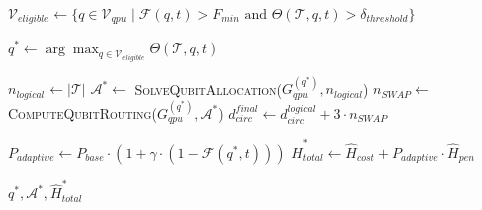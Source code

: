 \documentclass[lettersize,journal]{IEEEtran}
\begin{document}
\begin{algorithm}[t]
\scriptsize
\SetAlgoNoEnd
\caption{Fidelity-Aware Qubit Mapping and Task Scheduling}
\label{alg:fidelity_orchestration}
\BlankLine

\label{line:fo_retrieve_start}
\label{line:fo_retrieve_end}

\label{line:fo_filter}
$\mathcal{V}_{eligible} \leftarrow \{q \in \mathcal{V}_{qpu} \mid \mathcal{F}(q, t) > F_{min} \text{ and } \Theta(\mathcal{T}, q, t) > \delta_{threshold}\}$\;

\label{line:fo_check}

\label{line:fo_select}
$q^* \leftarrow \arg\max_{q \in \mathcal{V}_{eligible}} \Theta(\mathcal{T}, q, t)$\;

\label{line:fo_qubit_start}
$n_{logical} \leftarrow |\mathcal{T}|$\;
\label{line:fo_allocate}
$\mathcal{A}^* \leftarrow$ \textsc{SolveQubitAllocation}($G_{qpu}^{(q^*)}, n_{logical}$) 
\label{line:fo_route}
$n_{SWAP} \leftarrow$ \textsc{ComputeQubitRouting}($G_{qpu}^{(q^*)}, \mathcal{A}^*$)\;
\label{line:fo_depth}
$d_{circ}^{final} \leftarrow d_{circ}^{logical} + 3 \cdot n_{SWAP}$\;
\label{line:fo_qubit_end}

\label{line:fo_penalty}
$P_{adaptive} \leftarrow P_{base} \cdot (1 + \gamma \cdot (1 - \mathcal{F}(q^*, t)))$ 
\label{line:fo_hamiltonian}
$\hat{H}_{total}^* \leftarrow \hat{H}_{cost} + P_{adaptive} \cdot \hat{H}_{pen}$\;

\label{line:fo_return}
\Return $q^*, \mathcal{A}^*, \hat{H}_{total}^*$\;
\end{algorithm}
\end{document}

